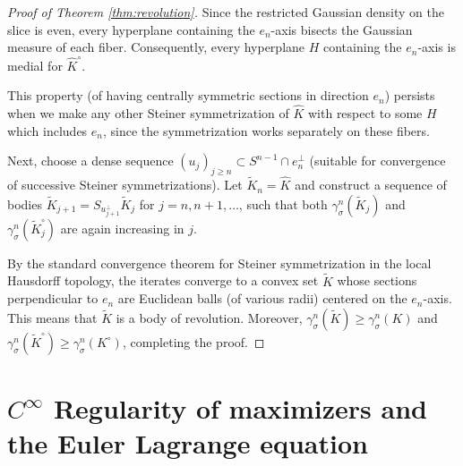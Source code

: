 \documentclass[12pt,oneside,reqno]{amsart}
\numberwithin{equation}{section}
\theoremstyle{remark}
\begin{document}
\begin{proof}[Proof of Theorem \ref{thm:revolution}]
Since the restricted Gaussian density on the slice is even, every hyperplane containing the \(e_n\)-axis bisects the Gaussian measure of each fiber. Consequently, every hyperplane $H$ containing the $e_n$-axis is medial for $\hat K^\circ$.

This property (of having centrally symmetric sections in direction $e_n$) 
persists when we make any other Steiner symmetrization of $\hat K$ with respect to some $H$ which includes $e_n$, since the symmetrization works separately on these fibers. 

Next, choose a dense sequence \((u_j)_{j\ge n}\subset S^{n-1}\cap e_n^\perp\) (suitable for convergence of successive Steiner symmetrizations). Let $\widetilde{K}_{n} = \hat K$ and construct a sequence of bodies $\widetilde{K}_{j+1} = S_{u_{j+1}^\perp} \widetilde{K}_{j}$ for $j = n,n+1, \ldots$, such that 
both $\gamma^n_\sigma(\widetilde{K}_j)$ and $\gamma^n_{\sigma}(\widetilde{K}_j^{\circ})$ are again increasing in $j$. 


By the standard convergence theorem for Steiner symmetrization in the local Hausdorff topology, the iterates converge to a convex
set \(\widetilde K\) whose sections perpendicular to \(e_n\) are Euclidean
balls (of various radii) centered on the \(e_n\)-axis. This means that $\widetilde{K}$ is a body of revolution.
Moreover,  $\gamma^n_\sigma(\widetilde{K})\ge \gamma^n_\sigma({K})$ and $\gamma^n_{\sigma}(\widetilde{K}^{\circ})\ge \gamma^n_{\sigma}(K^{\circ})$, completing the proof.
\end{proof}




\section{$C^\infty$ Regularity of maximizers and the Euler Lagrange equation}\label{sec:profiles}
\end{document}
